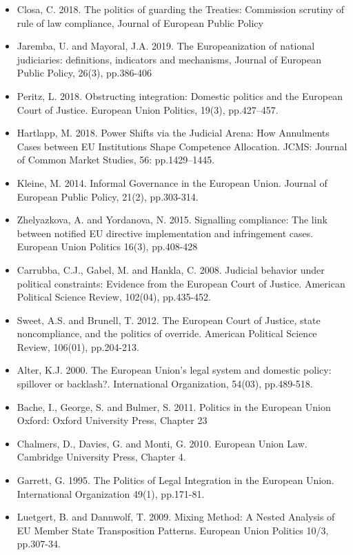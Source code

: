 \begin{itemize}
	\item Closa, C. 2018. The politics of guarding the Treaties: Commission scrutiny of rule of law compliance, Journal of European Public Policy
	\item Jaremba, U. and Mayoral, J.A. 2019. The Europeanization of national judiciaries: definitions, indicators and mechanisms, Journal of European Public Policy, 26(3), pp.386-406
	\item Peritz, L. 2018. Obstructing integration: Domestic politics and the European Court of Justice. European Union Politics, 19(3), pp.427–457.
	\item Hartlapp, M. 2018. Power Shifts via the Judicial Arena: How Annulments Cases between EU Institutions Shape Competence Allocation. JCMS: Journal of Common Market Studies, 56: pp.1429–1445.
	\item Kleine, M. 2014. Informal Governance in the European Union. Journal of European Public Policy, 21(2), pp.303-314.
	\item Zhelyazkova, A. and Yordanova, N. 2015. Signalling compliance: The link between notified EU directive implementation and infringement cases. European Union Politics 16(3), pp.408-428
	\item Carrubba, C.J., Gabel, M. and Hankla, C. 2008. Judicial behavior under political constraints: Evidence from the European Court of Justice. American Political Science Review, 102(04), pp.435-452. 
	\item Sweet, A.S. and Brunell, T. 2012. The European Court of Justice, state noncompliance, and the politics of override. American Political Science Review, 106(01), pp.204-213.
	\item Alter, K.J. 2000. The European Union's legal system and domestic policy: spillover or backlash?. International Organization, 54(03), pp.489-518.
	\item Bache, I., George, S. and Bulmer, S. 2011. Politics in the European Union Oxford: Oxford University Press, Chapter 23	
	\item Chalmers, D., Davies, G. and Monti, G. 2010. European Union Law. Cambridge University Press, Chapter 4.
	\item Garrett, G. 1995. The Politics of Legal Integration in the European Union. International Organization 49(1), pp.171-81.
	\item Luetgert, B. and Dannwolf, T. 2009. Mixing Method: A Nested Analysis of EU Member State Transposition Patterns. European Union Politics 10/3, pp.307-34.

\end{itemize}
